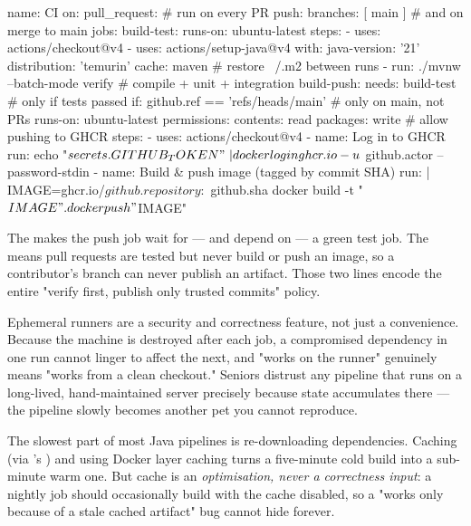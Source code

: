 \begin{yamlbox}
name: CI
on:
  pull_request:            # run on every PR
  push:
    branches: [ main ]     # and on merge to main
jobs:
  build-test:
    runs-on: ubuntu-latest
    steps:
      - uses: actions/checkout@v4
      - uses: actions/setup-java@v4
        with:
          java-version: '21'
          distribution: 'temurin'
          cache: maven      # restore ~/.m2 between runs
      - run: ./mvnw --batch-mode verify   # compile + unit + integration
  build-push:
    needs: build-test                     # only if tests passed
    if: github.ref == 'refs/heads/main'   # only on main, not PRs
    runs-on: ubuntu-latest
    permissions:
      contents: read
      packages: write                     # allow pushing to GHCR
    steps:
      - uses: actions/checkout@v4
      - name: Log in to GHCR
        run: echo "${{ secrets.GITHUB_TOKEN }}" \
             | docker login ghcr.io -u ${{ github.actor }} --password-stdin
      - name: Build & push image (tagged by commit SHA)
        run: |
          IMAGE=ghcr.io/${{ github.repository }}:${{ github.sha }}
          docker build -t "$IMAGE" .
          docker push "$IMAGE"
\end{yamlbox}

 The  makes the push job wait for --- and depend on --- a green test job. The  means pull requests are tested but never build or push an image, so a contributor's branch can never publish an artifact. Those two lines encode the entire "verify first, publish only trusted commits" policy.

\begin{seniornote}
Ephemeral runners are a security and correctness feature, not just a convenience. Because the machine is destroyed after each job, a compromised dependency in one run cannot linger to affect the next, and "works on the runner" genuinely means "works from a clean checkout." Seniors distrust any pipeline that runs on a long-lived, hand-maintained server precisely because state accumulates there --- the pipeline slowly becomes another pet you cannot reproduce.
\end{seniornote}

\begin{perfnote}
The slowest part of most Java pipelines is re-downloading dependencies. Caching  (via 's ) and using Docker layer caching turns a five-minute cold build into a sub-minute warm one. But cache is an \emph{optimisation, never a correctness input}: a nightly job should occasionally build with the cache disabled, so a "works only because of a stale cached artifact" bug cannot hide forever.
\end{perfnote}

